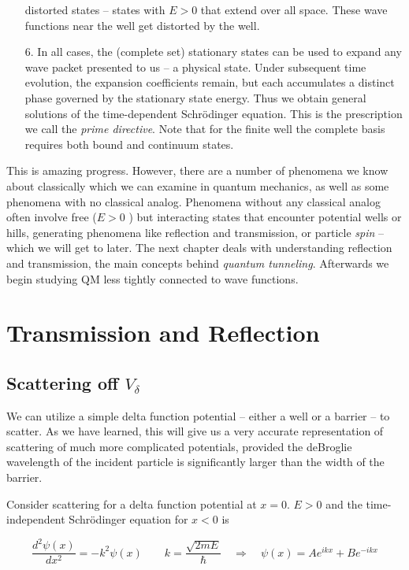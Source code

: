 \begin{itemize}
    distorted states -- states with $E>0$ that extend over all space. These
    wave functions near the well get distorted by the well. 
  \item[6.] In all cases, the (complete set) stationary states can be used to
    expand any wave packet presented to us -- a physical state. Under
    subsequent time evolution, the expansion coefficients remain, but each
    accumulates a distinct phase governed by the stationary state energy. Thus
    we obtain general solutions of the time-dependent Schr\"odinger equation.
    This is the prescription we call the \textit{prime directive}. Note that
    for the finite well the complete basis requires both bound and continuum
    states. 
\end{itemize}

This is amazing progress. However, there are a number of phenomena we know
about classically which we can examine in quantum mechanics, as well as some
phenomena with no classical analog. Phenomena without any classical analog
often involve free ($E>0$ ) but interacting states that encounter potential
wells or hills, generating phenomena like reflection and transmission, or
particle \textit{spin} -- which we will get to later. The next chapter deals
with understanding reflection and transmission, the main concepts behind
\textit{quantum tunneling}. Afterwards we begin studying QM less tightly
connected to wave functions. 


\section{Transmission and Reflection}

\subsection{Scattering off $V_\delta$} 

We can utilize a simple delta
function potential -- either a well or a barrier -- to scatter. As we have
learned, this will give us a very accurate representation of scattering of much
more complicated potentials, provided the deBroglie wavelength of the incident particle
is significantly larger than the width of the barrier. 

Consider scattering for a delta function potential at $x=0$. $E > 0$ and the
time-independent Schr\"odinger equation for $x < 0$ is 

\[
\frac{d^2 \psi(x)}{d x^2}  = -k^2 \psi(x) \qquad k = \frac{\sqrt{2mE}}{\hbar}
\quad \Rightarrow \quad \psi(x) = Ae^{ikx} + Be^{-ikx}
\] \vspace{3px}

